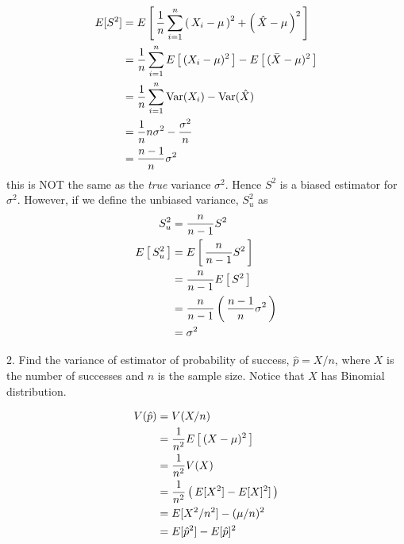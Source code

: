 \documentclass[10pt,a4paper]{report}
\newcommand{\BLUE}[1]{\textcolor{blue}{#1}}
\begin{document}
{	\begin{align*}
		E[S^2] &= E\left [\, \frac{1}{n} \sum_{i=1}^n \left (\, X_i - \mu \,\right )^2 +  \left (\, \hat{X} - \mu \,\right )^2 \,\right ] \\
			&= \frac{1}{n} \sum_{i=1}^n E\left [\, (X_i-\mu)^2 \,\right ]-E\left [\, (\bar{X}-\mu)^2 \,\right ] \\
			&= \frac{1}{n} \sum_{i=1}^n \text{Var}(X_i) - \text{Var}(\hat{X}) \\
			&= \frac{1}{n} n\sigma^2 - \frac{\sigma^2}{n} \\
			&= \frac{n-1}{n}\sigma^2
	\end{align*}this is NOT the same as the \textit{true} variance $\sigma^2$.  Hence $S^2$ is a biased estimator for $\sigma^2$.  However, if we define the unbiased variance, $S_u^2$ as 
	\begin{align*}
		S_u^2 &= \frac{n}{n-1} S^2 \\
		E\left [\, S_u^2 \,\right ] &= E\left [\, \frac{n}{n-1} S^2 \,\right ] \\
			&= \frac{n}{n-1} E\left [\, S^2 \,\right ] \\
			&= \frac{n}{n-1} \left (\, \frac{n-1}{n}\sigma^2 \,\right ) \\
			&= \sigma^2
	\end{align*} }

2. Find the variance of estimator of probability of success, $\hat{p}  = X/n$, where $X$ is the number of successes and $n$ is the sample size. Notice that $X$ has Binomial distribution.

\BLUE{
\begin{align*}
	V(\hat{p}) &= V(X/n) \\
	&= \frac{1}{n^2} E\left [\, (X- \mu)^2 \,\right ] \\
	&= \frac{1}{n^2} V(X) \\
	&= \frac{1}{n^2} \left (\,  E[X^2]- E[X]^2]  \,\right )\\
	&= E[X^2/n^2] - (\mu/n)^2 \\
	&= E[\hat{p}^2]-E[\hat{p}]^2
\end{align*} }
\end{document}
